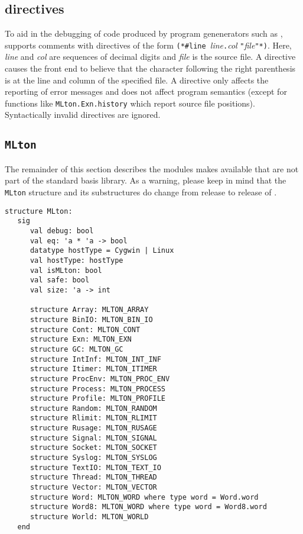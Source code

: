 
\subsection{{\nline} directives}
To aid in the debugging of code produced by program genenerators such as
,
{\mlton} supports comments with {\nline} directives of the form {\tt (*\#line
}{\it line}{\tt.}{\it col} {\tt "}{\it file}{\tt"*)}.  Here, {\it line} and {\it
col} are sequences of decimal digits and {\it file} is the source file.  A
{\nline} directive causes the front end to believe that the character following
the right parenthesis is at the line and column of the specified file.  A
{\nline} directive only affects the reporting of error messages and does not
affect program semantics (except for functions like {\tt MLton.Exn.history}
which report source file positions).  Syntactically invalid {\nline} directives
are ignored.

\subsection{{\tt MLton}}

The remainder of this section describes the modules {\mlton} makes available
that are not part of the standard basis library.  As a warning, please keep in
mind that the {\tt MLton} structure and its substructures do change from release
to release of {\mlton}.  

\begin{verbatim}
structure MLton:
   sig
      val debug: bool
      val eq: 'a * 'a -> bool
      datatype hostType = Cygwin | Linux
      val hostType: hostType
      val isMLton: bool
      val safe: bool
      val size: 'a -> int

      structure Array: MLTON_ARRAY
      structure BinIO: MLTON_BIN_IO
      structure Cont: MLTON_CONT
      structure Exn: MLTON_EXN
      structure GC: MLTON_GC
      structure IntInf: MLTON_INT_INF
      structure Itimer: MLTON_ITIMER
      structure ProcEnv: MLTON_PROC_ENV
      structure Process: MLTON_PROCESS
      structure Profile: MLTON_PROFILE
      structure Random: MLTON_RANDOM
      structure Rlimit: MLTON_RLIMIT
      structure Rusage: MLTON_RUSAGE
      structure Signal: MLTON_SIGNAL
      structure Socket: MLTON_SOCKET
      structure Syslog: MLTON_SYSLOG
      structure TextIO: MLTON_TEXT_IO
      structure Thread: MLTON_THREAD
      structure Vector: MLTON_VECTOR
      structure Word: MLTON_WORD where type word = Word.word
      structure Word8: MLTON_WORD where type word = Word8.word
      structure World: MLTON_WORLD
   end
\end{verbatim}

